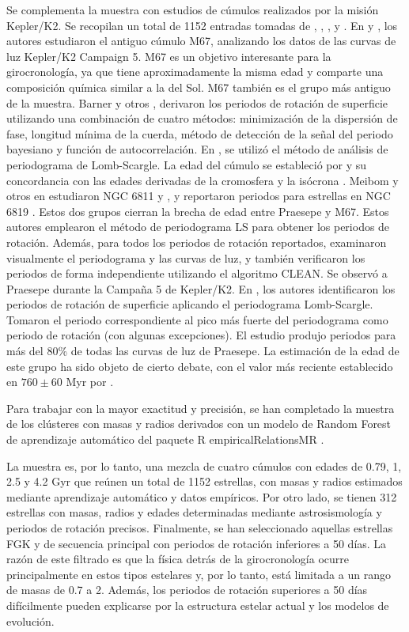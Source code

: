 Se complementa la muestra con estudios de cúmulos realizados por la misión Kepler/K2. Se recopilan un total de 1152 entradas tomadas de \cite{Barnes16}, \cite{Gonzalez16}, \cite{Meibom11}, \cite{Meibom15} y \cite{Rebull17}. En \cite{Barnes16} y \cite{Gonzalez16}, los autores estudiaron el antiguo cúmulo M67, analizando los datos de las curvas de luz Kepler/K2 Campaign 5. M67 es un objetivo interesante para la girocronología, ya que tiene aproximadamente la misma edad y comparte una composición química similar a la del Sol. M67 también es el grupo más antiguo de la muestra. Barner y otros \cite{Barnes16}, derivaron los periodos de rotación de superficie utilizando una combinación de cuatro métodos: minimización de la dispersión de fase, longitud mínima de la cuerda, método de detección de la señal del periodo bayesiano y función de autocorrelación. En \cite{Gonzalez16}, se utilizó el método de análisis de periodograma de Lomb-Scargle. La edad del cúmulo se estableció por \cite{Barnes16} y su concordancia con las edades derivadas de la cromosfera \cite{Giampapa06} y la isócrona \cite{Bellini10}. Meibom y otros en \cite{Meibom11} estudiaron NGC 6811 \cite{Janes13} y \cite{Meibom15}, y reportaron periodos para estrellas en NGC 6819 \cite{Jeffries13}. Estos dos grupos cierran la brecha de edad entre Praesepe y M67. Estos autores emplearon el método de periodograma LS para obtener los periodos de rotación. Además, para todos los periodos de rotación reportados, examinaron visualmente el periodograma y las curvas de luz, y también verificaron los periodos de forma independiente utilizando el algoritmo CLEAN. Se observó a Praesepe durante la Campaña 5 de Kepler/K2. En \cite{Rebull17}, los autores identificaron los periodos de rotación de superficie aplicando el periodograma Lomb-Scargle. Tomaron el periodo correspondiente al pico más fuerte del periodograma como periodo de rotación (con algunas excepciones). El estudio produjo periodos para más del 80\% de todas las curvas de luz de Praesepe. La estimación de la edad de este grupo ha sido objeto de cierto debate, con el valor más reciente establecido en $760 \pm 60$ Myr por \cite{Brandt15}.

Para trabajar con la mayor exactitud y precisión, se han completado la muestra de los clústeres con masas y radios derivados con un modelo de Random Forest de aprendizaje automático del paquete R empiricalRelationsMR \cite{Moya18}.


La muestra es, por lo tanto, una mezcla de cuatro cúmulos con edades de 0.79, 1, 2.5 y 4.2 Gyr que reúnen un total de 1152 estrellas, con masas y radios estimados mediante aprendizaje automático y datos empíricos. Por otro lado, se tienen 312 estrellas con masas, radios y edades determinadas mediante astrosismología y periodos de rotación precisos. Finalmente, se han seleccionado aquellas estrellas FGK y de secuencia principal con periodos de rotación inferiores a 50 días. La razón de este filtrado es que la física detrás de la girocronología ocurre principalmente en estos tipos estelares y, por lo tanto, está limitada a un rango de masas de 0.7 a 2. Además, los periodos de rotación superiores a 50 días difícilmente pueden explicarse por la estructura estelar actual y los modelos de evolución.

